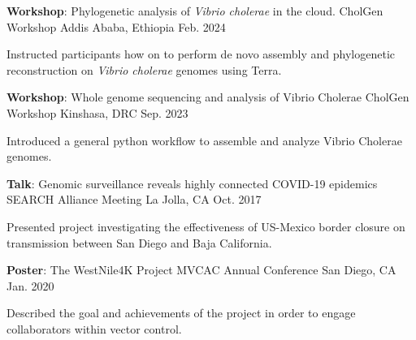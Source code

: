 
 \begin{cventries}
  \cventry
    {\textbf{Workshop}: Phylogenetic analysis of \textit{Vibrio cholerae} in the cloud.} %
    {CholGen Workshop} %
    {Addis Ababa, Ethiopia} %
    {Feb. 2024} %
    {
      \begin{cvitems} %
        \item {Instructed participants how on to perform de novo assembly and phylogenetic reconstruction on \textit{Vibrio cholerae} genomes using Terra.}
      \end{cvitems}
    }
  
  \cventry
    {\textbf{Workshop}: Whole genome sequencing and analysis of Vibrio Cholerae} %
    {CholGen Workshop} %
    {Kinshasa, DRC} %
    {Sep. 2023} %
    {
      \begin{cvitems} %
        \item {Introduced a general python workflow to assemble and analyze Vibrio Cholerae genomes.}
      \end{cvitems}
    }


  \cventry
    {\textbf{Talk}: Genomic surveillance reveals highly connected COVID-19 epidemics} %
    {SEARCH Alliance Meeting} %
    {La Jolla, CA} %
    {Oct. 2017} %
    {
      \begin{cvitems} %
        \item{Presented project investigating the effectiveness of US-Mexico border closure on transmission between San Diego and Baja California.}
      \end{cvitems}
    }
    
  \cventry
    {\textbf{Poster}: The WestNile4K Project} %
    {MVCAC Annual Conference} %
    {San Diego, CA} %
    {Jan. 2020} %
    {
      \begin{cvitems} %
        \item {Described the goal and achievements of the project in order to engage collaborators within vector control.}
      \end{cvitems}
    }


\end{cventries}
